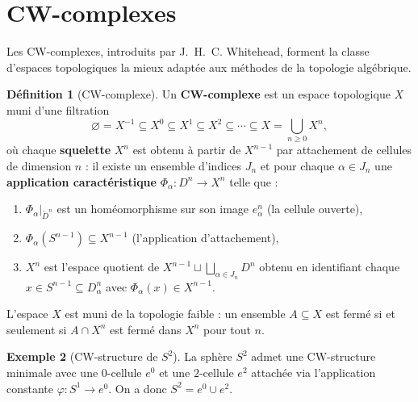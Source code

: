 \documentclass[12pt,a4paper,openany]{book}
\theoremstyle{definition}
\newtheorem{definition}{Définition}[chapter]
\newtheorem{exemple}[definition]{Exemple}
\theoremstyle{plain}
\theoremstyle{remark}
\begin{document}
\section{CW-complexes}\label{sec:CW}

Les CW-complexes, introduits par J.~H.~C.
Whitehead, forment la classe d'espaces topologiques la
mieux adaptée aux méthodes de la topologie algébrique.

\begin{definition}[CW-complexe]\label{def:CW-complexe}
Un \textbf{CW-complexe} est un espace topologique $X$ muni d'une filtration
\[
\varnothing = X^{-1} \subseteq X^0 \subseteq X^1 \subseteq X^2 \subseteq \cdots \subseteq X = \bigcup_{n \geqslant 0} X^n,
\]
où chaque \textbf{squelette} $X^n$ est obtenu à partir de
$X^{n-1}$ par attachement de cellules de dimension $n$ : il
existe un ensemble d'indices $J_n$ et pour chaque $\alpha \in J_n$ une
\textbf{application caractéristique}
$\Phi_\alpha : D^n \to X^n$ telle que :
\begin{enumerate}[label=(\roman*)]
\item $\Phi_\alpha|_{\mathring{D}^n}$ est un homéomorphisme sur son image
$e_\alpha^n$ (la cellule ouverte),
\item $\Phi_\alpha(S^{n-1}) \subseteq X^{n-1}$ (l'application d'attachement),
\item $X^n$ est l'espace quotient de $X^{n-1} \sqcup \bigsqcup_{\alpha \in
J_n} D^n$ obtenu en identifiant chaque $x \in S^{n-1} \subseteq D^n_\alpha$ avec
$\Phi_\alpha(x) \in X^{n-1}$.
\end{enumerate}
L'espace $X$ est muni de la topologie faible : un ensemble $A \subseteq X$ est
fermé si et seulement si $A \cap X^n$ est fermé dans $X^n$ pour tout $n$.
\end{definition}

\begin{exemple}[CW-structure de $S^2$]\label{ex:CW-S2}
La sphère $S^2$ admet une CW-structure minimale avec une $0$-cellule $e^0$ et
une $2$-cellule $e^2$ attachée via l'application constante
$\varphi : S^1 \to e^0$. On a donc $S^2 = e^0 \cup e^2$.

\begin{center}
\label{fig:CW-S2}
\end{center}
\end{exemple}
\end{document}
